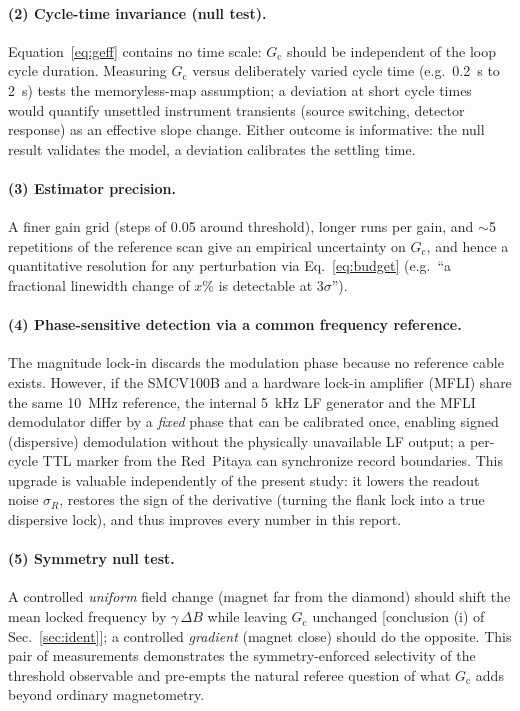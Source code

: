 \documentclass[11pt,a4paper]{article}
\newcommand{\Gc}{G_{\mathrm{c}}}
\begin{document}
\paragraph{(2) Cycle-time invariance (null test).} Equation~\eqref{eq:geff}
contains no time scale: $\Gc$ should be independent of the loop cycle
duration. Measuring $\Gc$ versus deliberately varied cycle time (e.g.\ 0.2~s
to 2~s) tests the memoryless-map assumption; a deviation at short cycle times
would quantify unsettled instrument transients (source switching, detector
response) as an effective slope change. Either outcome is informative: the
null result validates the model, a deviation calibrates the settling time.

\paragraph{(3) Estimator precision.} A finer gain grid (steps of 0.05 around
threshold), longer runs per gain, and $\sim$5 repetitions of the reference
scan give an empirical uncertainty on $\Gc$, and hence a quantitative
resolution for any perturbation via Eq.~\eqref{eq:budget} (e.g.\ ``a
fractional linewidth change of $x\%$ is detectable at $3\sigma$'').

\paragraph{(4) Phase-sensitive detection via a common frequency reference.}
The magnitude lock-in discards the modulation phase because no reference
cable exists. However, if the SMCV100B and a hardware lock-in amplifier (MFLI)
share the same 10~MHz reference, the internal 5~kHz LF generator and the MFLI
demodulator differ by a \emph{fixed} phase that can be calibrated once,
enabling signed (dispersive) demodulation without the physically unavailable
LF output; a per-cycle TTL marker from the Red~Pitaya can synchronize record
boundaries. This upgrade is valuable independently of the present study: it
lowers the readout noise $\sigma_R$, restores the sign of the derivative
(turning the flank lock into a true dispersive lock), and thus improves every
number in this report.

\paragraph{(5) Symmetry null test.} A controlled \emph{uniform} field change
(magnet far from the diamond) should shift the mean locked frequency by
$\gamma\,\Delta B$ while leaving $\Gc$ unchanged [conclusion (i) of
Sec.~\ref{sec:ident}]; a controlled \emph{gradient} (magnet close) should do
the opposite. This pair of measurements demonstrates the symmetry-enforced
selectivity of the threshold observable and pre-empts the natural referee
question of what $\Gc$ adds beyond ordinary magnetometry.
\end{document}
